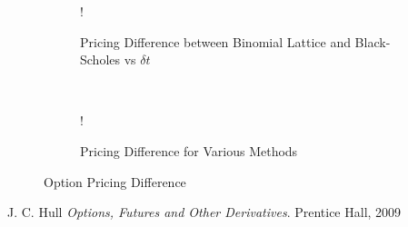 \documentclass[11pt, fleqn]{article}
\begin{document}
\begin{figure}[!h]
   \centering 
   \begin{subfigure}[b]{0.45\textwidth}
     	\resizebox {\textwidth} {!} { }
		\caption{Pricing Difference between Binomial Lattice and Black-Scholes vs $\delta t$}
		\label{fig:q4-bls-vs-binomial}
    \end{subfigure}
    ~
    \begin{subfigure}[b]{0.44\textwidth}
       	\resizebox {\textwidth} {!} { }
		\caption{Pricing Difference for Various Methods}
        \label{fig:q4-bls-vs-binomial-vs-monte-error}
    \end{subfigure}
    \caption{Option Pricing Difference}
	\label{fig:pricing-difference}
\end{figure}












\begin{thebibliography}{9}
J. C. Hull
\textit{Options, Futures and Other Derivatives}. 
Prentice Hall, 2009

\end{thebibliography}
\end{document}
